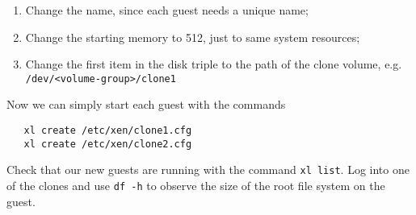 \documentclass{article}
\begin{document}
\begin{enumerate}
  \item Change the name, since each guest needs a unique name;
  \item Change the starting memory to 512, just to same system resources;
  \item Change the first item in the disk triple to the path of the clone volume, e.g. \texttt{/dev/<volume-group>/clone1}
 \end{enumerate}
 
 Now we can simply start each guest with the commands
 
 \begin{verbatim}
   xl create /etc/xen/clone1.cfg
   xl create /etc/xen/clone2.cfg
 \end{verbatim}
 
 Check that our new guests are running with the command \texttt{xl list}. Log into one of the clones and use \texttt{df -h} to observe the size of the root file system on the guest. 
 
 
\end{document}
